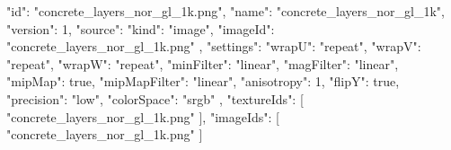 {
  "id": "concrete_layers_nor_gl_1k.png",
  "name": "concrete_layers_nor_gl_1k",
  "version": 1,
  "source": {
    "kind": "image",
    "imageId": "concrete_layers_nor_gl_1k.png"
  },
  "settings": {
    "wrapU": "repeat",
    "wrapV": "repeat",
    "wrapW": "repeat",
    "minFilter": "linear",
    "magFilter": "linear",
    "mipMap": true,
    "mipMapFilter": "linear",
    "anisotropy": 1,
    "flipY": true,
    "precision": "low",
    "colorSpace": "srgb"
  },
  "textureIds": [
    "concrete_layers_nor_gl_1k.png"
  ],
  "imageIds": [
    "concrete_layers_nor_gl_1k.png"
  ]
}
